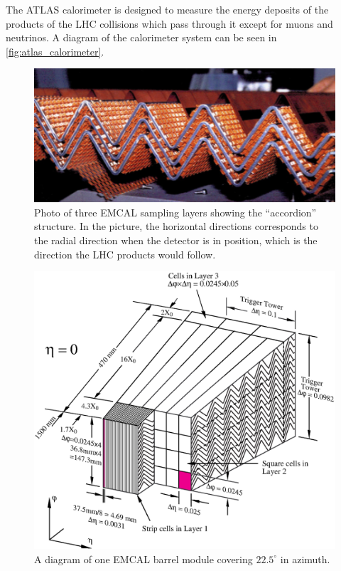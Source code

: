 The ATLAS calorimeter is designed to measure the energy
deposits of the products of the LHC collisions which pass through
it except for muons and neutrinos.  A diagram of the 
calorimeter system can be seen in \fig\ref{fig:atlas_calorimeter}.

\begin{figure}[ht]
\centering
\includegraphics[width=.5\textwidth]{figures/atlas/emcal_accordion.png}
\caption{Photo of three EMCAL sampling layers
showing the ``accordion'' structure. In the picture, 
the horizontal directions corresponds to 
the radial direction when the detector is in position, which is
the direction the LHC products would follow.}
\label{fig:atlas_emcal_accordion}
\end{figure}

\begin{figure}[ht]
\centering
\includegraphics[width=.8\textwidth]{figures/atlas/emcal_barrel_module.eps}
\caption{ A diagram of one EMCAL barrel module 
covering $22.5^{\circ}$ in azimuth.}
\label{fig:atlas_emcal_module}
\end{figure}

